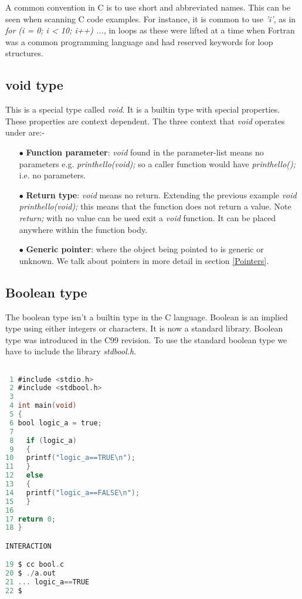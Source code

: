 A common convention in C is to use short and abbreviated names. This can be seen when scanning C code examples. For instance, it is common to use \textit{'i’}, as in \textit{for (i = 0; i < 10; i++) ...}, in loops as these were lifted at a time when Fortran was a common programming language and had reserved keywords for loop structures.

\subsection{void type} \label{voidtype}


This is a special type called \textit{void}. It is a builtin type with special properties. These properties are context dependent. The three context that \textit{void} operates under are:-

\begin{itemize}
  \item[$\bullet$]  \textbf{Function parameter}: \textit{void} found in the parameter-list means no parameters e.g. \textit{printhello(void);} so a caller function would have \textit{printhello();} i.e. no parameters.
  \item[$\bullet$] \textbf{Return type}: \textit{void} means no return. Extending the previous example \textit{void printhello(void);} this means that the function does not return a value. Note \textit{return;} with no value can be used exit a \textit{void} function. It can be placed anywhere within the function body.  
  \item[$\bullet$] \textbf{Generic pointer}: where the object being pointed to is generic or unknown. We talk about pointers in more detail in section \ref{Pointers}.
\end{itemize}

\subsection{Boolean type}\label{stdbool}


The boolean type isn't a builtin type in the C language. Boolean is an implied type using either integers or characters. It is now a standard library. Boolean type was introduced in the C99 revision. To use the standard boolean type we have to include the library \textit{stdbool.h}.\\

\begin{lstlisting}[language=C,showstringspaces=false,caption={File bool.c, using the stdbool.h bool type},captionpos=b,label=bool]

 1 #include <stdio.h>
 2 #include <stdbool.h>
 3 
 4 int main(void)
 5 {
 6 bool logic_a = true;
 7 
 8   if (logic_a) 
 9   {
10   printf("logic_a==TRUE\n");
11   }
12   else
13   {
14   printf("logic_a==FALSE\n");
15   }
16   
17 return 0;
18 }

INTERACTION

19 $ cc bool.c
20 $ ./a.out
21 ... logic_a==TRUE
22 $

\end{lstlisting}

